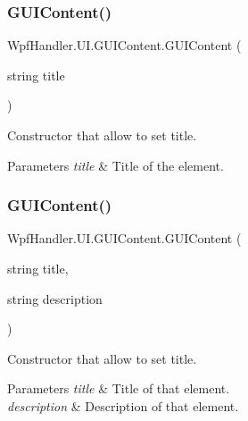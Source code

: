 \subsubsection{\texorpdfstring{G\+U\+I\+Content()}{GUIContent()}\hspace{0.1cm}{\footnotesize\ttfamily [2/5]}}
{\footnotesize\ttfamily Wpf\+Handler.\+U\+I.\+G\+U\+I\+Content.\+G\+U\+I\+Content (\begin{DoxyParamCaption}\item[{string}]{title }\end{DoxyParamCaption})}



Constructor that allow to set title. 


\begin{DoxyParams}{Parameters}
{\em title} & Title of the element.\\
\hline
\end{DoxyParams}
\mbox{\label{class_wpf_handler_1_1_u_i_1_1_g_u_i_content_a1b6b06ba3dceb601146432dc2366240f}} 
\subsubsection{\texorpdfstring{G\+U\+I\+Content()}{GUIContent()}\hspace{0.1cm}{\footnotesize\ttfamily [3/5]}}
{\footnotesize\ttfamily Wpf\+Handler.\+U\+I.\+G\+U\+I\+Content.\+G\+U\+I\+Content (\begin{DoxyParamCaption}\item[{string}]{title,  }\item[{string}]{description }\end{DoxyParamCaption})}



Constructor that allow to set title. 


\begin{DoxyParams}{Parameters}
{\em title} & Title of that element.\\
\hline
{\em description} & Description of that element.\\
\hline
\end{DoxyParams}
\mbox{\label{class_wpf_handler_1_1_u_i_1_1_g_u_i_content_a04d4c3d50ac71b80f193a3f8539a70ac}} 
